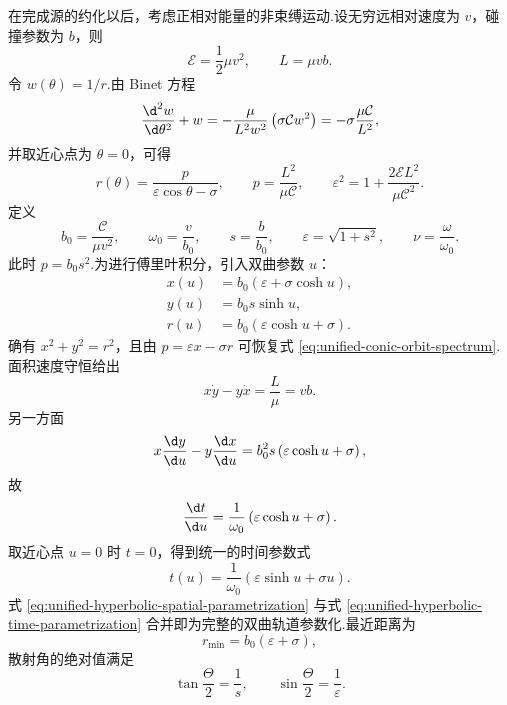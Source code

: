 在完成源的约化以后，考虑正相对能量的非束缚运动.设无穷远相对速度为 $v$，碰撞参数为 $b$，则
\begin{equation}
 \mathcal E=\frac{1}{2}\mu v^2,
 \qquad
 L=\mu vb.
 \label{eq:scattering-energy-angular-momentum}
\end{equation}
令 $w(\theta)=1/r$.由 Binet 方程
\begin{equation}
 \frac{\d^2w}{\d\theta^2}+w
 =-\frac{\mu}{L^2w^2}\left(\sigma\mathcal Cw^2\right)
 =-\sigma\frac{\mu\mathcal C}{L^2},
\end{equation}
并取近心点为 $\theta=0$，可得
\begin{equation}
 r(\theta)=\frac{p}{\varepsilon\cos\theta-\sigma},
 \qquad
 p=\frac{L^2}{\mu\mathcal C},
 \qquad
 \varepsilon^2=1+\frac{2\mathcal EL^2}{\mu\mathcal C^2}.
 \label{eq:unified-conic-orbit-spectrum}
\end{equation}
定义
\begin{equation}
 b_0=\frac{\mathcal C}{\mu v^2},
 \qquad
 \omega_0=\frac{v}{b_0},
 \qquad
 s=\frac{b}{b_0},
 \qquad
 \varepsilon=\sqrt{1+s^2},
 \qquad
 \nu=\frac{\omega}{\omega_0}.
 \label{eq:hyperbolic-dimensionless-parameters}
\end{equation}
此时 $p=b_0s^2$.为进行傅里叶积分，引入双曲参数 $u$：
\begin{equation}
 \begin{aligned}
 x(u)&=b_0\left(\varepsilon+\sigma\cosh u\right),\\
 y(u)&=b_0s\sinh u,\\
 r(u)&=b_0\left(\varepsilon\cosh u+\sigma\right).
 \end{aligned}
 \label{eq:unified-hyperbolic-spatial-parametrization}
\end{equation}
确有 $x^2+y^2=r^2$，且由 $p=\varepsilon x-\sigma r$ 可恢复式 \eqref{eq:unified-conic-orbit-spectrum}.面积速度守恒给出
\begin{equation}
 x\dot y-y\dot x=\frac{L}{\mu}=vb.
\end{equation}
另一方面
\begin{equation}
 x\frac{\d y}{\d u}-y\frac{\d x}{\d u}
 =b_0^2s\left(\varepsilon\cosh u+\sigma\right),
\end{equation}
故
\begin{equation}
 \frac{\d t}{\d u}
 =\frac{1}{\omega_0}\left(\varepsilon\cosh u+\sigma\right).
\end{equation}
取近心点 $u=0$ 时 $t=0$，得到统一的时间参数式
\begin{equation}
 t(u)=\frac{1}{\omega_0}\left(\varepsilon\sinh u+\sigma u\right).
 \label{eq:unified-hyperbolic-time-parametrization}
\end{equation}
式 \eqref{eq:unified-hyperbolic-spatial-parametrization} 与式 \eqref{eq:unified-hyperbolic-time-parametrization} 合并即为完整的双曲轨道参数化.最近距离为
\begin{equation}
 r_{\min}=b_0(\varepsilon+\sigma),
\end{equation}
散射角的绝对值满足
\begin{equation}
 \tan\frac{\Theta}{2}=\frac{1}{s},
 \qquad
 \sin\frac{\Theta}{2}=\frac{1}{\varepsilon}.
 \label{eq:rutherford-angle-s-parameter}
\end{equation}

